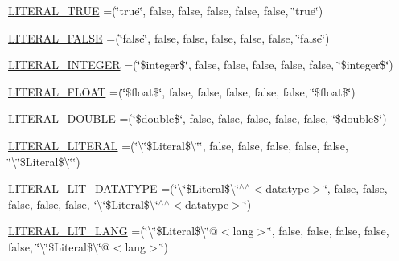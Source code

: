 \begin{DoxyCompactItemize}
\item 
\hyperlink{enumorg_1_1coode_1_1owlapi_1_1manchesterowlsyntax_1_1_manchester_o_w_l_syntax_a9bdd4c842d13c8389596b229c4ae453b}{L\-I\-T\-E\-R\-A\-L\-\_\-\-T\-R\-U\-E} =(\char`\"{}true\char`\"{}, false, false, false, false, false, \char`\"{}true\char`\"{})
\item 
\hyperlink{enumorg_1_1coode_1_1owlapi_1_1manchesterowlsyntax_1_1_manchester_o_w_l_syntax_ad580805ecd5e134f6e9d3483b031d25f}{L\-I\-T\-E\-R\-A\-L\-\_\-\-F\-A\-L\-S\-E} =(\char`\"{}false\char`\"{}, false, false, false, false, false, \char`\"{}false\char`\"{})
\item 
\hyperlink{enumorg_1_1coode_1_1owlapi_1_1manchesterowlsyntax_1_1_manchester_o_w_l_syntax_ae04c57033505a49bec150b3effeb63f8}{L\-I\-T\-E\-R\-A\-L\-\_\-\-I\-N\-T\-E\-G\-E\-R} =(\char`\"{}\$integer\$\char`\"{}, false, false, false, false, false, \char`\"{}\$integer\$\char`\"{})
\item 
\hyperlink{enumorg_1_1coode_1_1owlapi_1_1manchesterowlsyntax_1_1_manchester_o_w_l_syntax_a6f860f7ae19886931829438808f74fb1}{L\-I\-T\-E\-R\-A\-L\-\_\-\-F\-L\-O\-A\-T} =(\char`\"{}\$float\$\char`\"{}, false, false, false, false, false, \char`\"{}\$float\$\char`\"{})
\item 
\hyperlink{enumorg_1_1coode_1_1owlapi_1_1manchesterowlsyntax_1_1_manchester_o_w_l_syntax_af9531a6007f39a4eb2ebf26bdd048260}{L\-I\-T\-E\-R\-A\-L\-\_\-\-D\-O\-U\-B\-L\-E} =(\char`\"{}\$double\$\char`\"{}, false, false, false, false, false, \char`\"{}\$double\$\char`\"{})
\item 
\hyperlink{enumorg_1_1coode_1_1owlapi_1_1manchesterowlsyntax_1_1_manchester_o_w_l_syntax_a6b9d324941d8b35bbb87d35683ed3d97}{L\-I\-T\-E\-R\-A\-L\-\_\-\-L\-I\-T\-E\-R\-A\-L} =(\char`\"{}\textbackslash{}\char`\"{}\$Literal\$\textbackslash{}\char`\"{}\char`\"{}, false, false, false, false, false, \char`\"{}\textbackslash{}\char`\"{}\$Literal\$\textbackslash{}\char`\"{}\char`\"{})
\item 
\hyperlink{enumorg_1_1coode_1_1owlapi_1_1manchesterowlsyntax_1_1_manchester_o_w_l_syntax_a361b47a07f280b557fd51ab11bcabc52}{L\-I\-T\-E\-R\-A\-L\-\_\-\-L\-I\-T\-\_\-\-D\-A\-T\-A\-T\-Y\-P\-E} =(\char`\"{}\textbackslash{}\char`\"{}\$Literal\$\textbackslash{}\char`\"{}$^\wedge$$^\wedge$$<$datatype$>$\char`\"{}, false, false, false, false, false, \char`\"{}\textbackslash{}\char`\"{}\$Literal\$\textbackslash{}\char`\"{}$^\wedge$$^\wedge$$<$datatype$>$\char`\"{})
\item 
\hyperlink{enumorg_1_1coode_1_1owlapi_1_1manchesterowlsyntax_1_1_manchester_o_w_l_syntax_a3969157886705da24c0db56c33dfdf7f}{L\-I\-T\-E\-R\-A\-L\-\_\-\-L\-I\-T\-\_\-\-L\-A\-N\-G} =(\char`\"{}\textbackslash{}\char`\"{}\$Literal\$\textbackslash{}\char`\"{}@$<$lang$>$\char`\"{}, false, false, false, false, false, \char`\"{}\textbackslash{}\char`\"{}\$Literal\$\textbackslash{}\char`\"{}@$<$lang$>$\char`\"{})

\end{DoxyCompactItemize}
